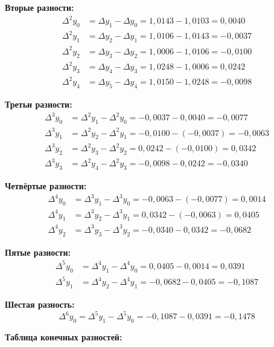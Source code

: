 \textbf{Вторые разности:}
\begin{align*}
\Delta^2 y_0 &= \Delta y_1 - \Delta y_0 = 1{,}0143 - 1{,}0103 = 0{,}0040 \\
\Delta^2 y_1 &= \Delta y_2 - \Delta y_1 = 1{,}0106 - 1{,}0143 = -0{,}0037 \\
\Delta^2 y_2 &= \Delta y_3 - \Delta y_2 = 1{,}0006 - 1{,}0106 = -0{,}0100 \\
\Delta^2 y_3 &= \Delta y_4 - \Delta y_3 = 1{,}0248 - 1{,}0006 = 0{,}0242 \\
\Delta^2 y_4 &= \Delta y_5 - \Delta y_4 = 1{,}0150 - 1{,}0248 = -0{,}0098
\end{align*}

\textbf{Третьи разности:}
\begin{align*}
\Delta^3 y_0 &= \Delta^2 y_1 - \Delta^2 y_0 = -0{,}0037 - 0{,}0040 = -0{,}0077 \\
\Delta^3 y_1 &= \Delta^2 y_2 - \Delta^2 y_1 = -0{,}0100 - (-0{,}0037) = -0{,}0063 \\
\Delta^3 y_2 &= \Delta^2 y_3 - \Delta^2 y_2 = 0{,}0242 - (-0{,}0100) = 0{,}0342 \\
\Delta^3 y_3 &= \Delta^2 y_4 - \Delta^2 y_3 = -0{,}0098 - 0{,}0242 = -0{,}0340
\end{align*}

\textbf{Четвёртые разности:}
\begin{align*}
\Delta^4 y_0 &= \Delta^3 y_1 - \Delta^3 y_0 = -0{,}0063 - (-0{,}0077) = 0{,}0014 \\
\Delta^4 y_1 &= \Delta^3 y_2 - \Delta^3 y_1 = 0{,}0342 - (-0{,}0063) = 0{,}0405 \\
\Delta^4 y_2 &= \Delta^3 y_3 - \Delta^3 y_2 = -0{,}0340 - 0{,}0342 = -0{,}0682
\end{align*}

\textbf{Пятые разности:}
\begin{align*}
\Delta^5 y_0 &= \Delta^4 y_1 - \Delta^4 y_0 = 0{,}0405 - 0{,}0014 = 0{,}0391 \\
\Delta^5 y_1 &= \Delta^4 y_2 - \Delta^4 y_1 = -0{,}0682 - 0{,}0405 = -0{,}1087
\end{align*}

\textbf{Шестая разность:}
\[
\Delta^6 y_0 = \Delta^5 y_1 - \Delta^5 y_0 = -0{,}1087 - 0{,}0391 = -0{,}1478
\]

\textbf{Таблица конечных разностей:}

